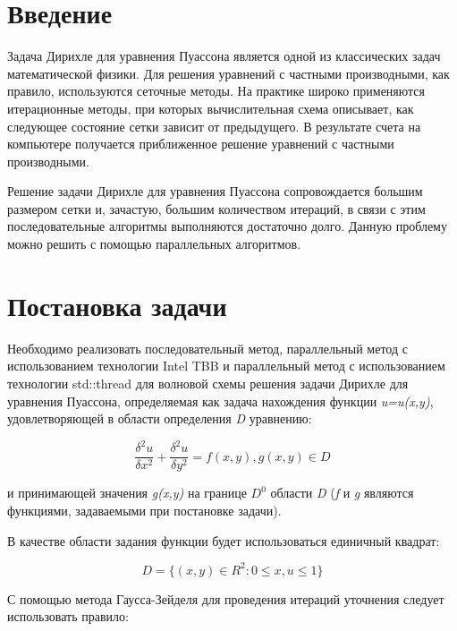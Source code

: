 \documentclass{report}
\begin{document}
\setcounter{page}{2}
\tableofcontents
\newpage

\section*{Введение}
\par Задача Дирихле для уравнения Пуассона является одной из классических задач математической физики. Для решения уравнений с частными производными, как правило, используются сеточные методы. На практике широко применяются итерационные методы, при которых вычислительная схема описывает, как следующее состояние сетки зависит от предыдущего. В результате счета на компьютере получается приближенное решение уравнений с частными производными.
\par Решение задачи Дирихле для уравнения Пуассона сопровождается большим размером сетки и, зачастую, большим количеством итераций, в связи с этим последовательные алгоритмы выполняются достаточно долго. Данную проблему можно решить с помощью параллельных алгоритмов.
\newpage

\section*{Постановка задачи}
\par Необходимо реализовать последовательный метод, параллельный метод с использованием технологии Intel TBB и параллельный метод с использованием технологии std::thread для волновой схемы решения задачи Дирихле для уравнения Пуассона, определяемая как задача нахождения функции {\textit{u=u(x,y)}}, удовлетворяющей в
области определения {\textit{D}} уравнению: 

{\LARGE $$\frac{\delta^{2}u}{\delta x^{2}} + \frac{\delta^{2}u}{\delta y^{2}} = f(x,y), g(x,y) \in D $$} 

и принимающей значения {\textit{g(x,y)}} на границе {\textit{$D^{0}$}} области {\textit{D}} ({\textit{f}} и {\textit{g}} являются функциями, задаваемыми при постановке задачи).
\par В качестве области задания функции будет использоваться единичный квадрат:

{\large $$D = \{(x, y) \in R^{2} : 0 \leq x, u \leq 1\}$$}

\par С помощью метода Гаусса-Зейделя для проведения итераций уточнения следует использовать правило:
\end{document}
